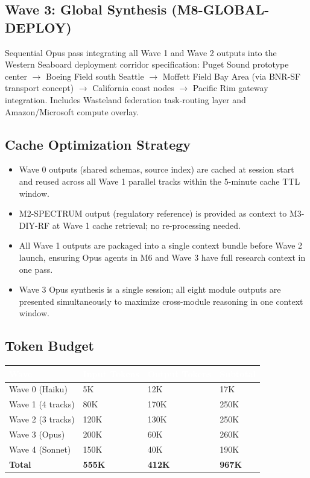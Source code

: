 \documentclass[11pt,letterpaper]{article}
\newcommand{\tableheader}[1]{\textbf{\sffamily\textcolor{white}{#1}}}
\begin{document}
\subsection{Wave 3: Global Synthesis (M8-GLOBAL-DEPLOY)}

Sequential Opus pass integrating all Wave 1 and Wave 2 outputs into the Western Seaboard deployment corridor specification: Puget Sound prototype center $\to$ Boeing Field south Seattle $\to$ Moffett Field Bay Area (via BNR-SF transport concept) $\to$ California coast nodes $\to$ Pacific Rim gateway integration. Includes Wasteland federation task-routing layer and Amazon/Microsoft compute overlay.

\subsection{Cache Optimization Strategy}

\begin{itemize}
  \item Wave 0 outputs (shared schemas, source index) are cached at session start and reused across all Wave 1 parallel tracks within the 5-minute cache TTL window.
  \item M2-SPECTRUM output (regulatory reference) is provided as context to M3-DIY-RF at Wave 1 cache retrieval; no re-processing needed.
  \item All Wave 1 outputs are packaged into a single context bundle before Wave 2 launch, ensuring Opus agents in M6 and Wave 3 have full research context in one pass.
  \item Wave 3 Opus synthesis is a single session; all eight module outputs are presented simultaneously to maximize cross-module reasoning in one context window.
\end{itemize}

\subsection{Token Budget}

\begin{center}
\begin{tabularx}{\textwidth}{L{4cm}C{2.5cm}C{2.5cm}C{2.5cm}}
\toprule
{}
\tableheader{Wave} & \tableheader{Input Tokens} & \tableheader{Output Tokens} & \tableheader{Subtotal} \\
\midrule
Wave 0 (Haiku) & 5K & 12K & 17K \\
Wave 1 (4 tracks) & 80K & 170K & 250K \\
Wave 2 (3 tracks) & 120K & 130K & 250K \\
Wave 3 (Opus) & 200K & 60K & 260K \\
Wave 4 (Sonnet) & 150K & 40K & 190K \\
\midrule
\textbf{Total} & \textbf{555K} & \textbf{412K} & \textbf{967K} \\
\bottomrule
\end{tabularx}
\end{center}
\end{document}
